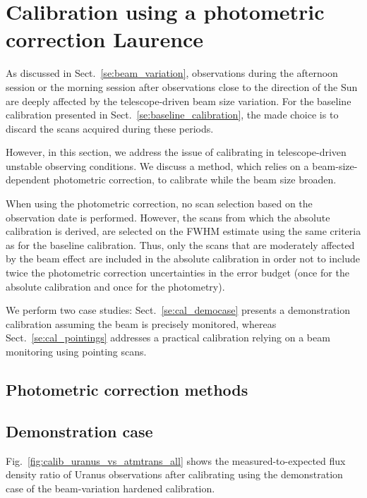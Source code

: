 \section{Calibration using a photometric correction {\color{blue} Laurence} }

As discussed in Sect.~\ref{se:beam_variation}, observations during the
afternoon session or the morning session after observations close to the
direction of the Sun are deeply affected by the telescope-driven beam
size variation. For the baseline calibration presented in
Sect.~\ref{se:baseline_calibration}, the made choice is to discard the
scans acquired during these periods.

However, in this section, we address the issue of calibrating in
telescope-driven unstable observing conditions. We discuss a method,
which relies on a beam-size-dependent photometric correction, to
calibrate while the beam size broaden.

When using the photometric correction, no scan selection based on the
observation date is performed. However, the scans from which the
absolute calibration is derived, are selected on the FWHM estimate
using the same criteria as for the baseline calibration. Thus, only
the scans that are moderately affected by the beam effect are included
in the absolute calibration in order not to include twice the
photometric correction uncertainties in the error budget (once for the
absolute calibration and once for the photometry).



We perform two case studies: Sect.~\ref{se:cal_democase} presents a demonstration
calibration assuming the beam is precisely monitored, whereas
Sect.~\ref{se:cal_pointings} addresses a practical calibration relying
on a beam monitoring using pointing scans. 

\subsection{Photometric correction methods}
\label{se:photocorr_methods}


\subsection{Demonstration case}
\label{se:photocorr_demo}


Fig.~\ref{fig:calib_uranus_vs_atmtrans_all} shows the
measured-to-expected flux density ratio of Uranus observations after
calibrating using the demonstration case of the beam-variation
hardened calibration. 


